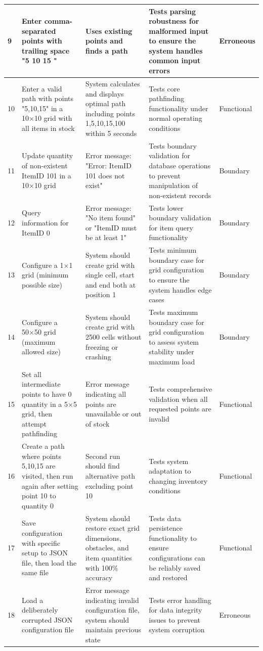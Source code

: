 \begin{longtable}{|p{}|p{}|p{}|p{}|p{}|}
	\hline
	9 & Enter comma-separated points with trailing space "5 10 15 " & Uses existing points and finds a path & Tests parsing robustness for malformed input to ensure the system handles common input errors & Erroneous \\
	\hline
	10 & Enter a valid path with points "5,10,15" in a 10×10 grid with all items in stock & System calculates and displays optimal path including points 1,5,10,15,100 within 5 seconds & Tests core pathfinding functionality under normal operating conditions & Functional \\
	\hline
	11 & Update quantity of non-existent ItemID 101 in a 10×10 grid & Error message: "Error: ItemID 101 does not exist" & Tests boundary validation for database operations to prevent manipulation of non-existent records & Boundary \\
	\hline
	12 & Query information for ItemID 0 & Error message: "No item found" or "ItemID must be at least 1" & Tests lower boundary validation for item query functionality & Boundary \\
	\hline
	13 & Configure a 1×1 grid (minimum possible size) & System should create grid with single cell, start and end both at position 1 & Tests minimum boundary case for grid configuration to ensure the system handles edge cases & Boundary \\
	\hline
	14 & Configure a 50×50 grid (maximum allowed size) & System should create grid with 2500 cells without freezing or crashing & Tests maximum boundary case for grid configuration to assess system stability under maximum load & Boundary \\
	\hline
	15 & Set all intermediate points to have 0 quantity in a 5×5 grid, then attempt pathfinding & Error message indicating all points are unavailable or out of stock & Tests comprehensive validation when all requested points are invalid & Functional \\
	\hline
	16 & Create a path where points 5,10,15 are visited, then run again after setting point 10 to quantity 0 & Second run should find alternative path excluding point 10 & Tests system adaptation to changing inventory conditions & Functional \\
	\hline
	17 & Save configuration with specific setup to JSON file, then load the same file & System should restore exact grid dimensions, obstacles, and item quantities with 100\% accuracy & Tests data persistence functionality to ensure configurations can be reliably saved and restored & Functional \\
	\hline
	18 & Load a deliberately corrupted JSON configuration file & Error message indicating invalid configuration file, system should maintain previous state & Tests error handling for data integrity issues to prevent system corruption & Erroneous \\

\end{longtable}
